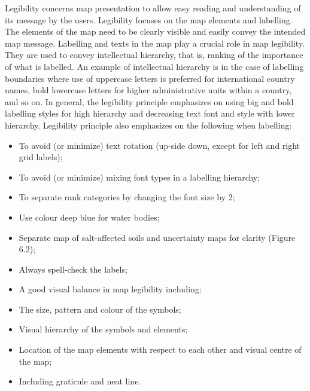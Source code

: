 \documentclass[
  10pt,
  b5paper,
]{book}
\providecommand{\tightlist}{%
  \setlength{\itemsep}{0pt}\setlength{\parskip}{0pt}}
\begin{document}
Legibility concerns map presentation to allow easy reading and understanding of its message by the users. Legibility focuses on the map elements and labelling. The elements of the map need to be clearly visible and easily convey the intended map message. Labelling and texts in the map play a crucial role in map legibility. They are used to convey intellectual hierarchy, that is, ranking of the importance of what is labelled. An example of intellectual hierarchy is in the case of labelling boundaries where use of uppercase letters is preferred for international country names, bold lowercase letters for higher administrative units within a country, and so on. In general, the legibility principle emphasizes on using big and bold labelling styles for high hierarchy and decreasing text font and style with lower hierarchy. Legibility principle also emphasizes on the following when labelling:

\begin{itemize}
\tightlist
\item
  To avoid (or minimize) text rotation (up-side down, except for left and right grid labels);
\item
  To avoid (or minimize) mixing font types in a labelling hierarchy;
\item
  To separate rank categories by changing the font size by 2;
\item
  Use colour deep blue for water bodies;
\item
  Separate map of salt-affected soils and uncertainty maps for clarity (Figure 6.2);
\item
  Always spell-check the labels;
\item
  A good visual balance in map legibility including:
\item
  The size, pattern and colour of the symbols;
\item
  Visual hierarchy of the symbols and elements;
\item
  Location of the map elements with respect to each other and visual centre of the map;
\item
  Including graticule and neat line.
\end{itemize}
\end{document}
